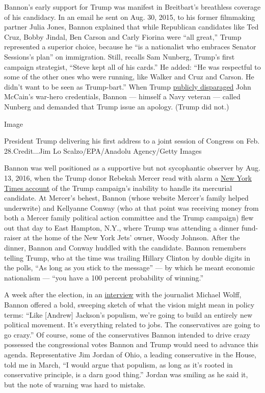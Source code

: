 Bannon's early support for Trump was manifest in Breitbart's breathless
coverage of his candidacy. In an email he sent on Aug. 30, 2015, to his
former filmmaking partner Julia Jones, Bannon explained that while
Republican candidates like Ted Cruz, Bobby Jindal, Ben Carson and Carly
Fiorina were ``all great,'' Trump represented a superior choice, because
he ``is a nationalist who embraces Senator Sessions's plan'' on
immigration. Still, recalls Sam Nunberg, Trump's first campaign
strategist, ``Steve kept all of his cards.'' He added: ``He was
respectful to some of the other ones who were running, like Walker and
Cruz and Carson. He didn't want to be seen as Trump-bart.'' When Trump
\href{https://www.nytimes3xbfgragh.onion/2015/07/19/us/politics/trump-belittles-mccains-war-record.html}{publicly
disparaged} John McCain's war-hero credentials, Bannon --- himself a
Navy veteran --- called Nunberg and demanded that Trump issue an
apology. (Trump did not.)

Image

President Trump delivering his first address to a joint session of
Congress on Feb. 28.Credit...Jim Lo Scalzo/EPA/Anadolu Agency/Getty
Images

Bannon was well positioned as a supportive but not sycophantic observer
by Aug. 13, 2016, when the Trump donor Rebekah Mercer read with alarm a
\href{https://www.nytimes3xbfgragh.onion/2016/08/14/us/politics/donald-trump-campaign-gop.html}{New
York Times account} of the Trump campaign's inability to handle its
mercurial candidate. At Mercer's behest, Bannon (whose website Mercer's
family helped underwrite) and Kellyanne Conway (who at that point was
receiving money from both a Mercer family political action committee and
the Trump campaign) flew out that day to East Hampton, N.Y., where Trump
was attending a dinner fund-raiser at the home of the New York Jets'
owner, Woody Johnson. After the dinner, Bannon and Conway huddled with
the candidate. Bannon remembers telling Trump, who at the time was
trailing Hillary Clinton by double digits in the polls, ``As long as you
stick to the message'' --- by which he meant economic nationalism ---
``you have a 100 percent probability of winning.''

A week after the election, in an
\href{http://www.hollywoodreporter.com/news/steve-bannon-trump-tower-interview-trumps-strategist-plots-new-political-movement-948747}{interview}
with the journalist Michael Wolff, Bannon offered a bold, sweeping
sketch of what the vision might mean in policy terms: ``Like
{[}Andrew{]} Jackson's populism, we're going to build an entirely new
political movement. It's everything related to jobs. The conservatives
are going to go crazy.'' Of course, some of the conservatives Bannon
intended to drive crazy possessed the congressional votes Bannon and
Trump would need to advance this agenda. Representative Jim Jordan of
Ohio, a leading conservative in the House, told me in March, ``I would
argue that populism, as long as it's rooted in conservative principle,
is a darn good thing.'' Jordan was smiling as he said it, but the note
of warning was hard to mistake.

